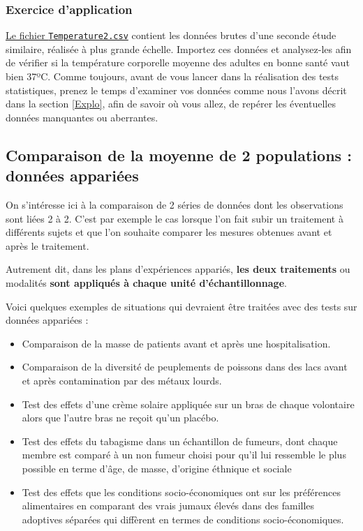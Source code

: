\documentclass[a4paperpaper,]{article}
\providecommand{\tightlist}{%
  \setlength{\itemsep}{0pt}\setlength{\parskip}{0pt}}
\begin{document}
\hypertarget{exercice-dapplication}{%
\subsubsection{Exercice d'application}\label{exercice-dapplication}}

\href{https://besibo.github.io/Biometrie3/data/Temperature2.csv}{Le fichier \texttt{Temperature2.csv}} contient les données brutes d'une seconde étude similaire, réalisée à plus grande échelle. Importez ces données et analysez-les afin de vérifier si la température corporelle moyenne des adultes en bonne santé vaut bien 37ºC. Comme toujours, avant de vous lancer dans la réalisation des tests statistiques, prenez le temps d'examiner vos données comme nous l'avons décrit dans la section \ref{Explo}, afin de savoir où vous allez, de repérer les éventuelles données manquantes ou aberrantes.

\hypertarget{comparaison-de-la-moyenne-de-2-populations-donnuxe9es-appariuxe9es}{%
\subsection{Comparaison de la moyenne de 2 populations : données appariées}\label{comparaison-de-la-moyenne-de-2-populations-donnuxe9es-appariuxe9es}}

On s'intéresse ici à la comparaison de 2 séries de données dont les observations sont liées 2 à 2. C'est par exemple le cas lorsque l'on fait subir un traitement à différents sujets et que l'on souhaite comparer les mesures obtenues avant et après le traitement.

Autrement dit, dans les plans d'expériences appariés, \textbf{les deux traitements} ou modalités \textbf{sont appliqués à chaque unité d'échantillonnage}.

Voici quelques exemples de situations qui devraient être traitées avec des tests sur données appariées :

\begin{itemize}
\tightlist
\item
  Comparaison de la masse de patients avant et après une hospitalisation.
\item
  Comparaison de la diversité de peuplements de poissons dans des lacs avant et après contamination par des métaux lourds.
\item
  Test des effets d'une crème solaire appliquée sur un bras de chaque volontaire alors que l'autre bras ne reçoit qu'un placébo.
\item
  Test des effets du tabagisme dans un échantillon de fumeurs, dont chaque membre est comparé à un non fumeur choisi pour qu'il lui ressemble le plus possible en terme d'âge, de masse, d'origine éthnique et sociale
\item
  Test des effets que les conditions socio-économiques ont sur les préférences alimentaires en comparant des vrais jumaux élevés dans des familles adoptives séparées qui diffèrent en termes de conditions socio-économiques.
\end{itemize}
\end{document}
